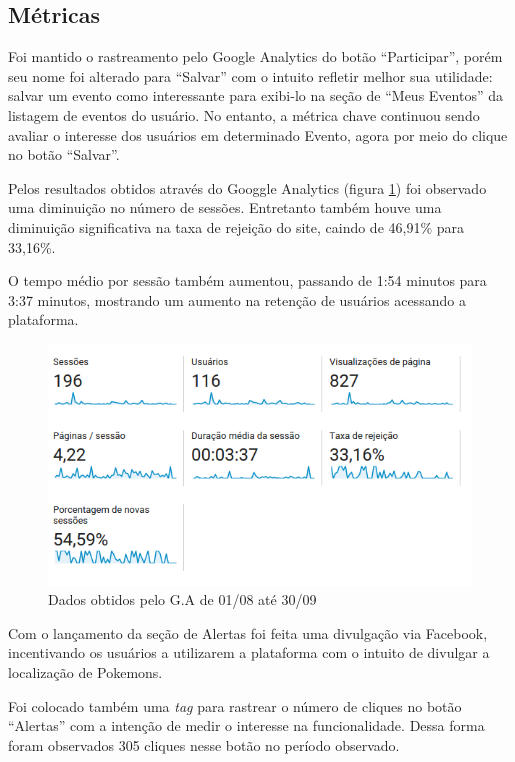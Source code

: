 \subsection{Métricas}

\par Foi mantido o rastreamento pelo Google Analytics do botão ``Participar'', porém seu nome foi alterado para ``Salvar'' com o intuito refletir melhor sua utilidade: salvar um evento como interessante para exibi-lo na seção de ``Meus Eventos'' da listagem de eventos do usuário. No entanto, a métrica chave continuou sendo avaliar o interesse dos usuários em determinado Evento, agora por meio do clique no botão ``Salvar''.
\par Pelos resultados obtidos através do Googgle Analytics (figura \ref{fig:analytics_2ainteracao_dados}) foi observado uma diminuição no número de sessões. Entretanto também houve uma diminuição significativa na taxa de rejeição do site, caindo de 46,91\% para 33,16\%.
\par O tempo médio por sessão também aumentou, passando de 1:54 minutos para 3:37 minutos, mostrando um aumento na retenção de usuários acessando a plataforma.
\begin{figure}[htb]
\centering
\includegraphics[width=15cm]{figuras/analytics_2ainteracao_dados}
\caption{\label{fig:analytics_2ainteracao_dados} Dados obtidos pelo G.A de 01/08 até 30/09}
\end{figure}
\par Com o lançamento da seção de Alertas foi feita uma divulgação via Facebook, incentivando os usuários a utilizarem a plataforma com o intuito de divulgar a localização de Pokemons.
\par Foi colocado também uma \emph{tag} para rastrear o número de cliques no botão ``Alertas'' com a intenção de medir o interesse na funcionalidade. Dessa forma foram observados 305 cliques nesse botão no período observado.

